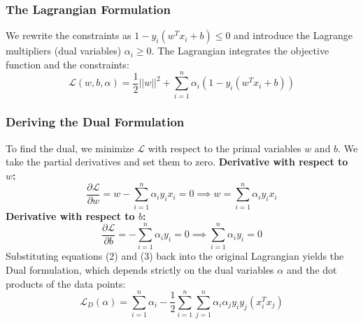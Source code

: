 \documentclass[twoside, 10pt]{article}
\begin{document}
\subsubsection{The Lagrangian Formulation}
We rewrite the constraints as $1 - y_i(w^T x_i + b) \le 0$ and introduce the Lagrange multipliers (dual variables) $\alpha_i \ge 0$. The Lagrangian integrates the objective function and the constraints:
\begin{equation}
    \mathcal{L}(w, b, \alpha) = \frac{1}{2}||w||^2 + \sum_{i=1}^n \alpha_i \left( 1 - y_i(w^T x_i + b) \right)
\end{equation}
\subsubsection{Deriving the Dual Formulation}
To find the dual, we minimize $\mathcal{L}$ with respect to the primal variables $w$ and $b$. We take the partial derivatives and set them to zero.
\textbf{Derivative with respect to $w$:}
\begin{equation}
    \frac{\partial \mathcal{L}}{\partial w} = w - \sum_{i=1}^n \alpha_i y_i x_i = 0 \implies w = \sum_{i=1}^n \alpha_i y_i x_i
\end{equation}
\textbf{Derivative with respect to $b$:}
\begin{equation}
    \frac{\partial \mathcal{L}}{\partial b} = -\sum_{i=1}^n \alpha_i y_i = 0 \implies \sum_{i=1}^n \alpha_i y_i = 0
\end{equation}
Substituting equations (2) and (3) back into the original Lagrangian yields the Dual formulation, which depends strictly on the dual variables $\alpha$ and the dot products of the data points:
\begin{equation}
    \mathcal{L}_D(\alpha) = \sum_{i=1}^n \alpha_i - \frac{1}{2} \sum_{i=1}^n \sum_{j=1}^n \alpha_i \alpha_j y_i y_j (x_i^T x_j)
\end{equation}
\end{document}
